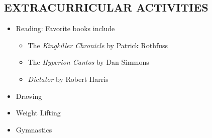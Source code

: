 \documentclass{res}
\begin{document}
\begin{resume}
	
 
\section{EXTRACURRICULAR ACTIVITIES} 
\begin{itemize}
    \item Reading: Favorite books include 
    	\begin{itemize}
    	\item The \textit{Kingkiller Chronicle} by Patrick Rothfuss
    	\item The \textit{Hyperion Cantos} by Dan Simmons
    	\item \textit{Dictator} by Robert Harris
    	\end{itemize}
    \item Drawing
    \item Weight Lifting
    \item Gymnastics
    \end{itemize}
             
   
    
\end{resume}
\end{document}
